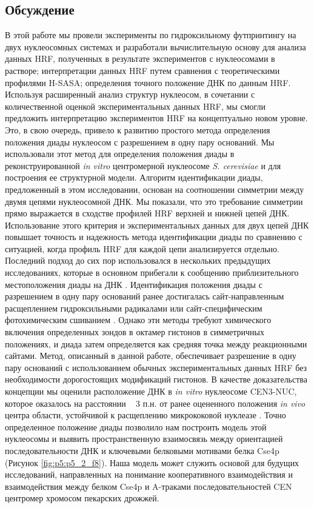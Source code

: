 \subsection{Обсуждение}
В этой работе мы провели эксперименты по гидроксильному футпринтингу на двух нуклеосомных системах и разработали вычислительную основу для анализа данных HRF, полученных в результате экспериментов с нуклеосомами в растворе; интерпретации данных HRF путем сравнения с теоретическими профилями H-SASA; определения точного положение ДНК по данным HRF. Используя расширенный анализ структур нуклеосом, в сочетании с количественной оценкой экспериментальных данных HRF, мы смогли предложить интерпретацию экспериментов HRF на концептуально новом уровне. Это, в свою очередь, привело к развитию простого метода определения положения диады нуклеосом с разрешением в одну пару оснований. Мы использовали этот метод для определения положения диады в реконструированной \textit{in vitro} центромерной нуклеосоме \textit{S. cerevisiae} и для построения ее структурной модели. 
Алгоритм  идентификации диады, предложенный в этом исследовании, основан на соотношении симметрии между двумя цепями нуклеосомной ДНК. Мы показали, что это требование симметрии прямо выражается в сходстве профилей HRF верхней и нижней цепей ДНК. Использование этого критерия и экспериментальных данных для двух цепей ДНК повышает точность и надежность метода идентификации диады по сравнению с ситуацией, когда профиль HRF для каждой цепи анализируется отдельно. Последний подход до сих пор использовался в нескольких предыдущих исследованиях, которые в основном прибегали к сообщению приблизительного местоположения диады на ДНК \cite{hayes_structure_1990,widlund_nucleosome_1999,morozov_using_2009,ober_12-dgpg_2008,cannistraro_rapid_2015}. Идентификация положения диады с разрешением в одну пару оснований ранее достигалась сайт-направленным расщеплением гидроксильными радикалами или сайт-специфическим фотохимическим сшиванием \cite{flaus_mapping_1996,kassabov_high-resolution_2002}. Однако эти методы требуют химического включения определенных зондов в октамер гистонов в симметричных положениях, и диада затем определяется как средняя точка между реакционными сайтами. Метод, описанный в данной работе, обеспечивает разрешение в одну пару оснований с использованием обычных экспериментальных данных HRF без необходимости дорогостоящих модификаций гистонов. 
В качестве доказательства концепции мы оценили расположение ДНК в \textit{in vitro} нуклеосоме CEN3-NUC, которое оказалось на расстоянии ~ 3 п.н. от ранее оцененного положения \textit{in vivo} центра области, устойчивой к расщеплению микрококовой нуклеазе \cite{cole_centromeric_2011}. Точно определенное положение диады позволило нам построить модель этой нуклеосомы и выявить пространственную взаимосвязь между ориентацией последовательности ДНК и ключевыми белковыми мотивами белка Cse4p (Рисунок \ref{fig:p5:p5_2_f8}). Наша модель может служить основой для будущих исследований, направленных на понимание кооперативного взаимодействия и взаимодействия между белком Cse4p и A-траками последовательностей CEN центромер хромосом пекарских дрожжей.

